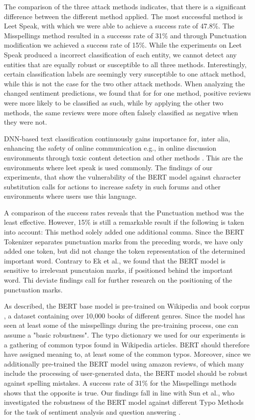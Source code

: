 The comparison of the three attack methods indicates, that there is a significant difference between the different method applied. The most successful method is Leet Speak, with which we were able to achieve a success rate of 47.8\%. The Misspellings method resulted in a successs rate of 31\% and through Punctuation modification we achieved a success rate of 15\%. While the experiments on Leet Speak produced a incorrect classification of each entity, we cannot detect any entities that are equally robust or susceptible to all three methods. Interestingly, certain classification labels are seemingly very susceptible to one attack method, while this is not the case for the two other attack methods. When analyzing the changed sentiment predictions, we found that for for one method, positive reviews were more likely to be classified as such, while by applying the other two methods, the same reviews were more often falsely classified as negative when they were not. 

DNN-based text classification continuously gains importance for, inter alia, enhancing the safety of online communication e.g., in online discussion environments through toxic content detection and other methods \cite{kumar2011natural}. This are the environments where leet speak is used commonly. The findings of our experiments, that show the vulnerability of the BERT model against character substitution calls for actions to increase safety in such forums and other environments where users use this language. 

A comparison of the success rates reveals that the Punctuation method was the least effective. However, 15\% is still a remarkable result if the following is taken into account:
This method solely added one additional comma. Since the BERT Tokenizer separates punctuation marks from the preceding words, we have only added one token, but did not change the token representation of the determined important word. Contrary to Ek et al., we found that the BERT model is sensitive to irrelevant puncutaion marks, if positioned behind the important word. Thi deviate findings call for further research on the positioning of the punctuation marks. 

As described, the BERT base model is pre-trained on Wikipedia and book corpus \cite{zhu2015aligning}, a dataset containing over 10,000 books of different genres. Since the model has seen at least some of the misspellings during the pre-training process, one can assume a "basic robustness". The typo dictionary we used for our experiments is a gathering of common typos found in Wikipedia articles. BERT should therefore have assigned meaning to, at least some of the common typos. Moreover, since we additionally pre-trained the BERT model using amazon reviews, of which many include the processing of user-generated data, the BERT model should be robust against spelling mistakes. A success rate of 31\% for the Misspellings methods shows that the opposite is true. Our findings fall in line with Sun et al., who investigated the robustness of the BERT model against different Typo Methods for the task of sentiment analysis and question answering \cite{sun2020adv}.

